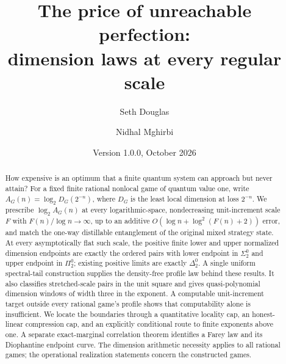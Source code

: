 \documentclass[11pt,a4paper]{article}
\title{The price of unreachable perfection:\\dimension laws at every regular scale}
\author{Seth Douglas \and Nidhal Mghirbi}
\date{Version 1.0.0, October 2026}
\theoremstyle{definition}
\theoremstyle{remark}
\numberwithin{equation}{section}
\begin{document}
\maketitle
\begingroup\renewcommand{\thefootnote}{}\endgroup
\begin{abstract}
How expensive is an optimum that a finite quantum system can approach but never attain? For a fixed finite rational nonlocal game of quantum value one, write $A_G(n)=\log_2D_G(2^{-n})$, where $D_G$ is the least local dimension at loss $2^{-n}$. We prescribe $\log_2 A_G(n)$ at every logarithmic-space, nondecreasing unit-increment scale $F$ with $F(n)/\log n\to\infty$, up to an additive $O(\log n+\log^2(F(n)+2))$ error, and match the one-way distillable entanglement of the original mixed strategy state. At every asymptotically flat such scale, the positive finite lower and upper normalized dimension endpoints are exactly the ordered pairs with lower endpoint in $\Sigma^0_2$ and upper endpoint in $\Pi^0_2$; existing positive limits are exactly $\Delta^0_2$. A single uniform spectral-tail construction supplies the density-free profile law behind these results. It also classifies stretched-scale pairs in the unit square and gives quasi-polynomial dimension windows of width three in the exponent. A computable unit-increment target outside every rational game's profile shows that computability alone is insufficient. We locate the boundaries through a quantitative locality cap, an honest-linear compression cap, and an explicitly conditional route to finite exponents above one. A separate exact-marginal correlation theorem identifies a Farey law and its Diophantine endpoint curve. The dimension arithmetic necessity applies to all rational games; the operational realization statements concern the constructed games.
\end{abstract}
\clearpage







\appendix



\end{document}
